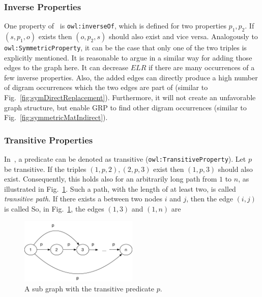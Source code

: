 \subsubsection{Inverse Properties}\label{sec:approachInverse}

One property of~\cite{owl} is {\tt owl:inverseOf}, which is defined for two properties $p_1, p_2$. If $(s,p_1,o)$ exists then $(o,p_2,s)$ should also exist and vice versa. Analogously to {\tt owl:SymmetricProperty}, it can be the case that only one of the two triples is explicitly mentioned. It is reasonable to argue in a similar way for adding those edges to the graph here. It can decrease $ELR$ if there are many occurrences of a few inverse properties. Also, the added edges can directly produce a high number of digram occurrences which the two edges are part of (similar to Fig.~\ref{fig:symDirectReplacement}). Furthermore, it will not create an unfavorable graph structure, but enable GRP to find other digram occurrences (similar to Fig.~\ref{fig:symmetricMatIndirect}).

\clearpage
\subsubsection{Transitive Properties}\label{sec:approachTransitive}

In~\cite{owl}, a predicate can be denoted as transitive ({\tt owl:TransitiveProperty}). Let $p$ be transitive. If the triples $(1,p,2),(2,p,3)$ exist then $(1,p,3)$ should also exist. Consequently, this holds also for an arbitrarily long path from $1$ to $n$, as illustrated in Fig.~\ref{fig:transitiveMat}. Such a path, with the length of at least two, is called \textit{transitive path}. If there exists a \tp between two nodes $i$ and $j$, then the edge $(i,j)$ is called \dtpp So, in Fig.~\ref{fig:transitiveMat}, the edges $(1,3)$ and $(1,n)$ are \dtpsp

\begin{figure}[h]
	\centering
	\includegraphics[width=0.5\textwidth]{figures/approach/transitiveMat}
	\caption{A sub graph with the transitive predicate $p$.}
	\label{fig:transitiveMat}
\end{figure}

